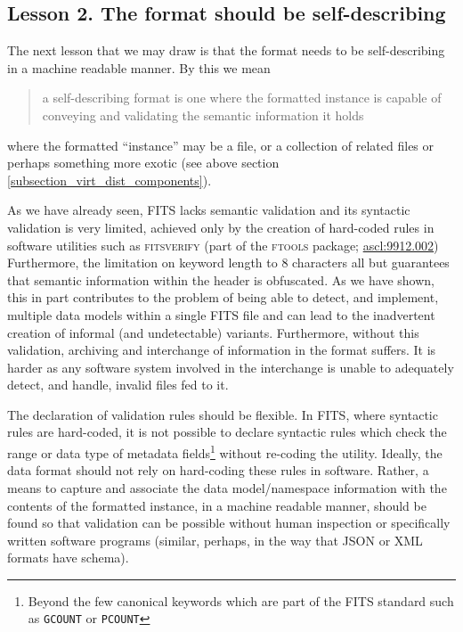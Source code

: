 \documentclass[final,authoryear,5p,times,twocolumn]{elsarticle}
\begin{document}
{{\subsection{Lesson 2. The format should be self-describing}
\label{section_lesson_2}

The next lesson that we may draw is that the format needs to be 
self-describing in a machine readable manner. By this we mean 

\begin{quote}
a self-describing format is one where the formatted instance
is capable of conveying and validating the semantic information 
it holds
\end{quote}

where the formatted ``instance'' may be a file, or a collection 
of related files or perhaps something more exotic (see above section
\ref{subsection_virt_dist_components}). 

As we have already seen, FITS lacks semantic validation and its
syntactic validation is very limited, achieved only by the creation
of hard-coded rules in software utilities such as \textsc{fitsverify}
(part of the \textsc{ftools} package; \href{http://ascl.net/9912.002}{ascl:9912.002})
Furthermore, the limitation on
keyword length to 8 characters all but guarantees that semantic
information within the header is obfuscated. As we have shown,
this in part contributes to the problem of being able to detect,
and implement, multiple data models within a single FITS file
and can lead to the inadvertent creation of informal (and
undetectable) variants. Furthermore, without this validation,
archiving and interchange of information in the format suffers.
It is harder as any software system involved in the interchange
is unable to adequately detect, and handle, invalid files fed to
it.

The declaration of validation rules should be flexible. In FITS,
where syntactic rules are hard-coded, it is not possible to
declare syntactic rules which check the range or data type of
metadata fields\footnote{Beyond the few canonical keywords
which are part of the FITS standard such as \texttt{GCOUNT} 
or \texttt{PCOUNT}} without re-coding the utility.
Ideally, the data format should not rely on hard-coding these rules
in software. Rather, a means to capture and associate the data
model/namespace information with the contents of the formatted
instance, in a machine readable manner, should be found so that
validation can be possible without human inspection or specifically
written software programs (similar, perhaps, in the way that JSON
or XML formats have schema).


}}
\end{document}
